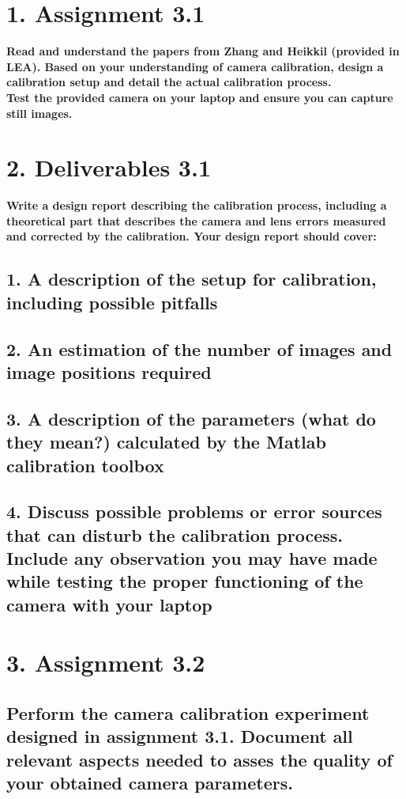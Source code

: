 \section*{1. Assignment 3.1}
\textbf{Read and understand the papers from Zhang and Heikkil (provided in LEA). Based on your understanding of camera calibration, design a calibration setup and detail the actual calibration process. \\
Test the provided camera on your laptop and ensure you can capture still images.}


\section*{2. Deliverables 3.1}
\textbf{Write a design report describing the calibration process, including a theoretical part that describes the camera and lens errors measured and corrected by the calibration. Your design report should cover:}

\subsection*{1. A description of the setup for calibration, including possible pitfalls}

\subsection*{2. An estimation of the number of images and image positions required}

\subsection*{3. A description of the parameters (what do they mean?) calculated by the Matlab calibration toolbox}

\subsection*{4. Discuss possible problems or error sources that can disturb the calibration process. Include any observation you may have made while testing the proper functioning of the camera with your laptop}

\section*{3. Assignment 3.2}
\subsection*{Perform the camera calibration experiment designed in assignment 3.1. Document all relevant aspects needed to asses the quality of your obtained camera parameters.}

